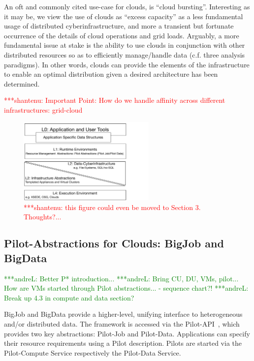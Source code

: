 \documentclass[times]{cpeauth}
\newcommand{\jhanote}[1]{ {\textcolor{red} { ***shantenu: #1 }}}
\newcommand{\alnote}[1]{ {\textcolor{green} { ***andreL: #1 }}}
\newcommand{\alnote}[1]{}
\newcommand{\jhanote}[1]{}
\newcommand{\pilot}{Pilot\xspace}
\newcommand{\pilots}{Pilots\xspace}
\newcommand{\pilotjob}{Pilot-Job\xspace}
\newcommand{\pilotdata}{Pilot-Data\xspace}
\newcommand{\pilotdataservice}{Pilot-Data Service\xspace}
\newcommand{\pilotcomputeservice}{Pilot-Compute Service\xspace}
\begin{document}
An oft and commonly cited use-case for clouds, is ``cloud bursting''.
Interesting as it may be, we view the use of clouds as ``excess
capacity'' as a less fundamental usage of distributed
cyberinfrastructure, and more a transient but fortunate occurrence of
the details of cloud operations and grid loads. Arguably, a more
fundamental issue at stake is the ability to use clouds in conjunction
with other distributed resources so as to efficiently manage/handle
data (c.f. three analysis paradigms).  In other words, clouds can
provide the elements of the infrastructure to enable an optimal
distribution given a desired architecture has been determined.

\jhanote{Important Point: How do we handle affinity across different
  infrastructures: grid-cloud}




\begin{figure}[t] \centering
\includegraphics[width=0.6\textwidth]{figures/data-intensive-arch.pdf}
\caption{\jhanote{this figure could even be moved to Section 3. Thoughts?...}}
\label{fig:figures_arch}
\end{figure}



\subsection{Pilot-Abstractions for Clouds: BigJob and BigData}

\alnote{Better P* introduction...}
\alnote{Bring CU, DU, VMs, pilot... How are VMs started through Pilot 
abstractions... - sequence chart?!}
\alnote{Break up 4.3 in compute and data section?}

BigJob and BigData provide a higher-level, unifying interface to heterogeneous
and/or distributed data. The framework is accessed via the
Pilot-API~\cite{pilot_api}, which provides two key abstractions: \pilotjob and
\pilotdata. Applications can specify their resource requirements using a
\pilot description. \pilots are started via the \pilotcomputeservice
respectively the \pilotdataservice.
\end{document}
